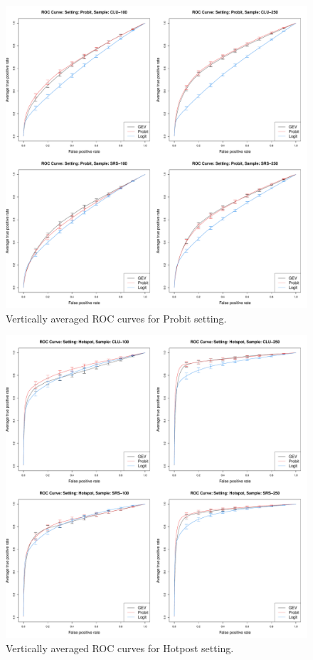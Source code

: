 \documentclass[11pt]{article}
\begin{document}
\begin{figure}
  \includegraphics[width=\linewidth]{plots/sim-perf-probit}
  \caption{Vertically averaged ROC curves for Probit setting.}
  \label{rbfig:simrocpro}
\end{figure}

\begin{figure}
  \includegraphics[width=\linewidth]{plots/sim-perf-hotspot}
  \caption{Vertically averaged ROC curves for Hotpost setting.}
  \label{rbfig:simrochot}
\end{figure}
\end{document}
